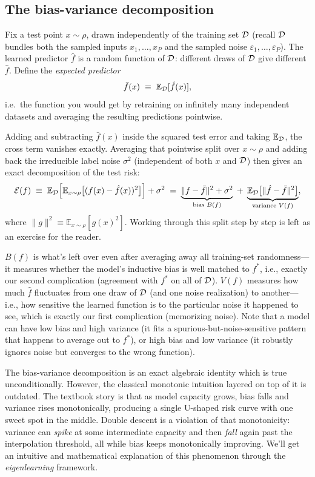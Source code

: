 \subsection*{The bias-variance decomposition}

Fix a test point $x\sim \rho$, drawn independently of the training set $\mathcal{D}$ (recall $\mathcal{D}$ bundles both the sampled inputs $x_1,\dots,x_P$ and the sampled noise $\varepsilon_1,\dots,\varepsilon_P$). The learned predictor $\hat f$ is a random function of $\mathcal{D}$: different draws of $\mathcal{D}$ give different $\hat f$. Define the \emph{expected predictor}
\[
\bar f(x) \;\equiv\; \mathbb{E}_{\mathcal{D}}[\hat f(x)],
\]
i.e.\ the function you would get by retraining on infinitely many independent datasets and averaging the resulting predictions pointwise.

Adding and subtracting $\bar f(x)$ inside the squared test error and taking $\mathbb{E}_{\mathcal{D}}$, the cross term vanishes exactly. Averaging that pointwise split over $x\sim \rho$ and adding back the irreducible label noise $\sigma^2$ (independent of both $x$ and $\mathcal{D}$) then gives an exact decomposition of the test risk:
\begin{equation}
\mathcal{E}(f) \;\equiv\; \mathbb{E}_{\mathcal{D}}\Big[\mathbb{E}_{x\sim \rho}\big[(f(x)-\hat f(x))^2\big]\Big] + \sigma^2
\;=\; \underbrace{\|f - \bar f\|^2 + \sigma^2}_{\text{bias } B(f)} \;+\; \underbrace{\mathbb{E}_{\mathcal{D}}\big[\|\hat f - \bar f\|^2\big]}_{\text{variance } V(f)},
\label{eq:bv-final}
\end{equation}
where $\|g\|^2 \equiv \mathbb{E}_{x\sim \rho}[g(x)^2]$. Working through this split step by step is left as an exercise for the reader.
 
$B(f)$ is what's left over even after averaging away all training-set randomness---it measures whether the model's inductive bias is well matched to $f^*$, i.e., exactly our second complication (agreement with $f^*$ on all of $\mathcal{D}$). $V(f)$ measures how much $\hat f$ fluctuates from one draw of $\mathcal{D}$ (and one noise realization) to another---i.e., how sensitive the learned function is to the particular noise it happened to see, which is exactly our first complication (memorizing noise). Note that a model can have low bias and high variance (it fits a spurious-but-noise-sensitive pattern that happens to average out to $f^*$), or high bias and low variance (it robustly ignores noise but converges to the wrong function).
 
\bigskip
The bias-variance decomposition is an exact algebraic identity which is true unconditionally. However, the classical monotonic intuition layered on top of it is outdated. The textbook story is that as model capacity grows, bias falls and variance rises monotonically, producing a single U-shaped risk curve with one sweet spot in the middle. Double descent is a violation of that monotonicity: variance can \emph{spike} at some intermediate capacity and then \emph{fall} again past the interpolation threshold, all while bias keeps monotonically improving. We'll get an intuitive and mathematical explanation of this phenomenon through the \textit{eigenlearning} framework.
 
